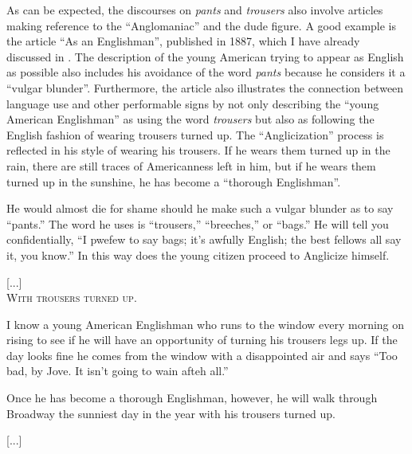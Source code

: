 As can be expected, the discourses on \emph{pants} and \emph{trousers} also involve articles making reference to the “Anglomaniac” and the dude figure. A good example is the article “As an Englishman”, published in 1887, which I have already discussed in . The description of the young American trying to appear as English as possible also includes his avoidance of the word \emph{pants} because he considers it a “vulgar blunder”. Furthermore, the article also illustrates the connection between language use and other performable signs by not only describing the “young American Englishman” as using the word \emph{trousers} but also as following the English fashion of wearing trousers turned up. The “Anglicization” process is reflected in his style of wearing his trousers. If he wears them turned up in the rain, there are still traces of Americanness left in him, but if he wears them turned up in the sunshine, he has become a “thorough Englishman”.

\begin{ipquote}
{He would almost die for shame should he make such a vulgar blunder as to say “pants.” The word he uses is “trousers,” “breeches,” or “bags.” He will tell you confidentially, “I pwefew to say bags; it’s awfully English; the best fellows all say it, you know.” In this way do{\kern0pt}es the young citizen proceed to Anglicize himself.

\centering
{[...]}\\
\textsc{With trousers turned up.}

I know a young American Englishman who runs to the window every morning on rising to see if he will have an opportunity of turning his trousers legs up. If the day looks fine he comes from the window with a disappointed air and says “Too bad, by Jove. It isn’t going to wain afteh all.”} {Once he has become a thorough Englishman, however, he will walk through Broadway the sunniest day in the year with his trousers turned up.

\centering
{[...]}\\
}
\end{ipquote}


